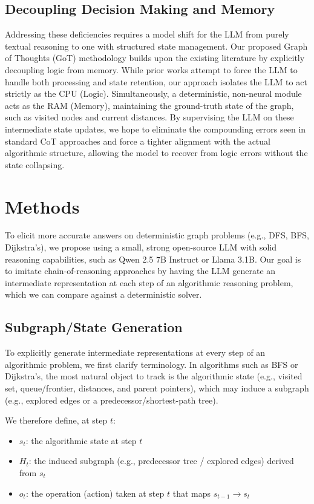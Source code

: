 \documentclass[sigplan,screen]{acmart}
\begin{document}
\subsection{Decoupling Decision Making and Memory}
Addressing these deficiencies requires a model shift for the LLM from purely textual reasoning to one with structured state management. Our proposed Graph of Thoughts (GoT) methodology builds upon the existing literature by explicitly decoupling logic from memory. While prior works attempt to force the LLM to handle both processing and state retention, our approach isolates the LLM to act strictly as the CPU (Logic). Simultaneously, a deterministic, non-neural module acts as the RAM (Memory), maintaining the ground-truth state of the graph, such as visited nodes and current distances. By supervising the LLM on these intermediate state updates, we hope to eliminate the compounding errors seen in standard CoT approaches and force a tighter alignment with the actual algorithmic structure, allowing the model to recover from logic errors without the state collapsing.

\section{Methods}
To elicit more accurate answers on deterministic graph problems (e.g., DFS, BFS, Dijkstra's), we propose using a small, strong open-source LLM with solid reasoning capabilities, such as Qwen 2.5 7B Instruct or Llama 3.1B. Our goal is to imitate chain-of-reasoning approaches by having the LLM generate an intermediate representation at each step of an algorithmic reasoning problem, which we can compare against a deterministic solver.
\subsection{Subgraph/State Generation}
To explicitly generate intermediate representations at every step of an algorithmic problem, we first clarify terminology. In algorithms such as BFS or Dijkstra's, the most natural object to track is the algorithmic state (e.g., visited set, queue/frontier, distances, and parent pointers), which may induce a subgraph (e.g., explored edges or a predecessor/shortest-path tree).

We therefore define, at step $t$:
\begin{itemize}
  \item $s_t$: the algorithmic state at step $t$
  \item $H_t$: the induced subgraph (e.g., predecessor tree / explored edges) derived from $s_t$
  \item $o_t$: the operation (action) taken at step $t$ that maps $s_{t-1} \rightarrow s_t$
\end{itemize}
\end{document}
